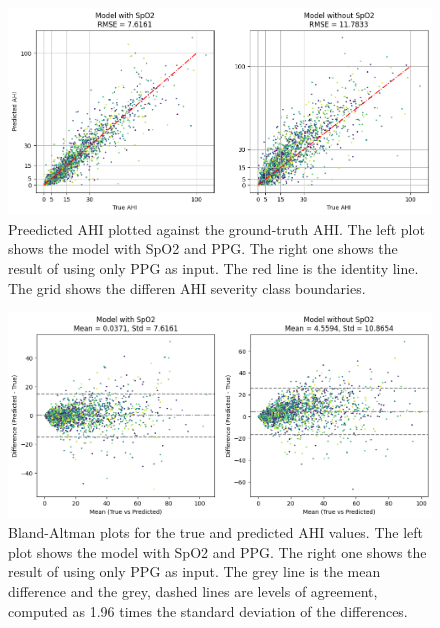 \begin{figure}
    \centering
    \includegraphics[width=\textwidth]{images/AhiPlots}
    \caption{Preedicted AHI plotted against the ground-truth AHI. The left plot shows the model with SpO2 and PPG. The right one shows the result of using only PPG as input. The red line is the identity line. The grid shows the differen AHI severity class boundaries.}
    \label{fig:ahi-plots}
\end{figure}

\begin{figure}
    \centering
    \includegraphics[width=\textwidth]{images/BlandAltmanPlots}
    \caption{Bland-Altman plots for the true and predicted AHI values. The left plot shows the model with SpO2 and PPG. The right one shows the result of using only PPG as input. The grey line is the mean difference and the grey, dashed lines are levels of agreement, computed as 1.96 times the standard deviation of the differences.}
    \label{fig:bland-altman-plots}
\end{figure}

